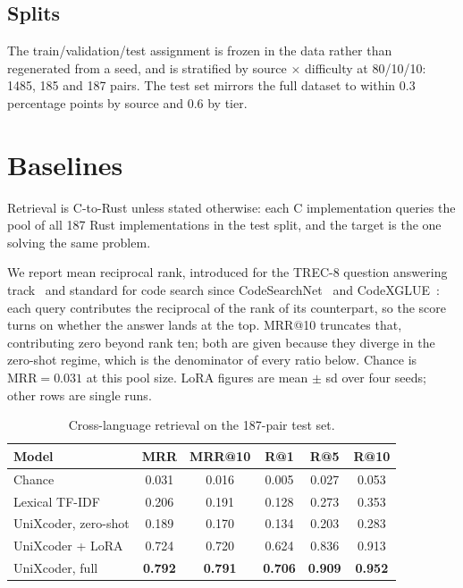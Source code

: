 \subsection{Splits}

The train/validation/test assignment is frozen in the data rather than
regenerated from a seed, and is stratified by source $\times$ difficulty at
80/10/10: 1485, 185 and 187 pairs. The test set mirrors the full dataset to
within 0.3 percentage points by source and 0.6 by tier.

\section{Baselines}
\label{sec:baselines}

Retrieval is C-to-Rust unless stated otherwise: each C implementation queries
the pool of all 187 Rust implementations in the test split, and the target is
the one solving the same problem.

We report mean reciprocal rank, introduced for the TREC-8 question answering
track~\cite{voorhees1999trec8} and standard for code search since
CodeSearchNet~\cite{husain2019codesearchnet} and CodeXGLUE~\cite{lu2021codexglue}:
each query contributes the reciprocal of the rank of its counterpart, so the
score turns on whether the answer lands at the top. MRR@10 truncates that,
contributing zero beyond rank ten; both are given because they diverge in the
zero-shot regime, which is the denominator of every ratio below. Chance is
$\mathrm{MRR}=0.031$ at this pool size. LoRA figures are mean $\pm$ sd over
four seeds; other rows are single runs.

\begin{table}[tbp]
\caption{Cross-language retrieval on the 187-pair test set.}
\label{tab:baselines}
\centering
\begin{tabular}{lccccc}
\toprule
Model & MRR & MRR@10 & R@1 & R@5 & R@10 \\
\midrule
Chance                 & 0.031 & 0.016 & 0.005 & 0.027 & 0.053 \\
Lexical TF-IDF         & 0.206 & 0.191 & 0.128 & 0.273 & 0.353 \\
\midrule
UniXcoder, zero-shot   & 0.189 & 0.170 & 0.134 & 0.203 & 0.283 \\
UniXcoder + LoRA       & 0.724 & 0.720 & 0.624 & 0.836 & 0.913 \\
UniXcoder, full        & \textbf{0.792} & \textbf{0.791} & \textbf{0.706} & \textbf{0.909} & \textbf{0.952} \\
\bottomrule
\end{tabular}
\end{table}

